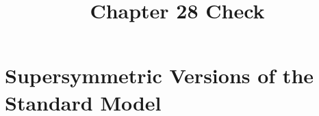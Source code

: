 \documentclass[11pt,a4paper]{article}
\title{Chapter 28 Check}
\author{}
\makeatletter
\numberwithin{equation}{subsection}
\newcommand{\checklabel}[2]{%
  \begingroup
  \def\@currentlabel{#2}%
  \label{#1}%
  \endgroup
}
\makeatother
\begin{document}
\maketitle
\setcounter{section}{27}
\section{Supersymmetric Versions of the Standard Model}

\checklabel{eq:17.5.33}{17.5.33}
\checklabel{eq:17.5.34}{17.5.34}
\checklabel{eq:17.5.41}{17.5.41}
\checklabel{eq:18.7.2}{18.7.2}
\checklabel{eq:21.3.19}{21.3.19}
\checklabel{eq:21.3.30}{21.3.30}
\checklabel{eq:21.3.34}{21.3.34}
\checklabel{eq:21.5.15}{21.5.15}
\checklabel{eq:21.5.16}{21.5.16}
\checklabel{eq:26.4.4}{26.4.4}
\checklabel{eq:26.4.7}{26.4.7}
\checklabel{eq:26.4.11}{26.4.11}
\checklabel{eq:27.2.11}{27.2.11}
\checklabel{eq:27.3.22}{27.3.22}
\checklabel{eq:27.4.7}{27.4.7}
\checklabel{eq:27.4.8}{27.4.8}
\checklabel{eq:27.4.9}{27.4.9}
\checklabel{eq:27.5.4}{27.5.4}
\checklabel{eq:27.5.6}{27.5.6}
\checklabel{eq:27.5.11}{27.5.11}
\checklabel{eq:27.5.12}{27.5.12}
\checklabel{eq:27.9.45}{27.9.45}
\checklabel{eq:29.2.10}{29.2.10}










\end{document}
